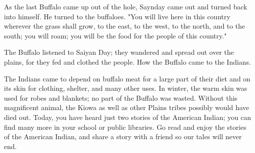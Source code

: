 As the last Buffalo came up out of the hole, Saynday came out and turned back into himself. He turned to the buffaloes. "You will live here in this country wherever the grass shall grow, to the east, to the west, to the north, and to the south; you will roam; you will be the food for the people of this country."

The Buffalo listened to Saiyan Day; they wandered and spread out over the plains, for they fed and clothed the people. How the Buffalo came to the Indians.

The Indians came to depend on buffalo meat for a large part of their diet and on its skin for clothing, shelter, and many other uses. In winter, the warm skin was used for robes and blankets; no part of the Buffalo was wasted. Without this magnificent animal, the Kiowa as well as other Plains tribes possibly would have died out. Today, you have heard just two stories of the American Indian; you can find many more in your school or public libraries. Go read and enjoy the stories of the American Indian, and share a story with a friend so our tales will never end.